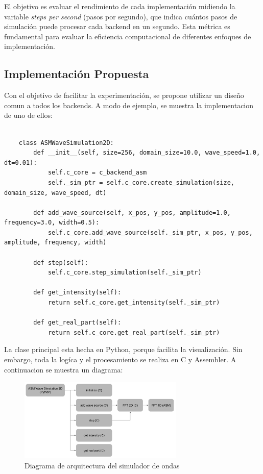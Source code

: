 \documentclass[a4paper]{article}
\begin{document}
El objetivo es evaluar el rendimiento de cada implementación midiendo la variable \textit{steps per second} (pasos por segundo), que
indica cuántos pasos de simulación puede procesar cada backend en un segundo. Esta métrica es fundamental para evaluar la eficiencia
computacional de diferentes enfoques de implementación.

\subsection{Implementación Propuesta}
Con el objetivo de facilitar la experimentación, se propone utilizar un diseño comun a todos los backends. A modo de ejemplo, se muestra
la implementacion de uno de ellos:

\begin{verbatim}
    
    class ASMWaveSimulation2D:
        def __init__(self, size=256, domain_size=10.0, wave_speed=1.0, dt=0.01):
            self.c_core = c_backend_asm
            self._sim_ptr = self.c_core.create_simulation(size, domain_size, wave_speed, dt)
        
        def add_wave_source(self, x_pos, y_pos, amplitude=1.0, frequency=3.0, width=0.5):
            self.c_core.add_wave_source(self._sim_ptr, x_pos, y_pos, amplitude, frequency, width)
        
        def step(self):
            self.c_core.step_simulation(self._sim_ptr)
        
        def get_intensity(self):
            return self.c_core.get_intensity(self._sim_ptr)
        
        def get_real_part(self):
            return self.c_core.get_real_part(self._sim_ptr)
\end{verbatim}

La clase principal esta hecha en Python, porque facilita la visualización. Sin embargo, toda la logíca y el procesamiento se realiza
en C y Assembler. A continuacion se muestra un diagrama:
\begin{figure}[h]
    \centering
    \includegraphics[width=0.7\textwidth]{extra/diagram.png}
    \caption{Diagrama de arquitectura del simulador de ondas}
    \label{fig:wave_sim_architecture}
\end{figure}
\end{document}
